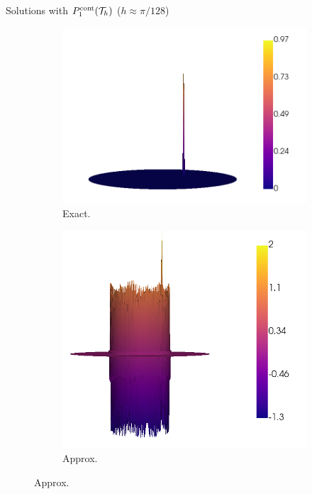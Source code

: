 	\begin{frame}{Solutions with $\relax{P}^{\text{cont}}_1(\mathcal{T}_h)$ ($h\approx \pi/128$)}
		\begin{figure}[h!]
			\begin{subfigure}{0.49\textwidth}
				\centering
				\includegraphics[scale=0.23]{img/Conveccion_Reaccion/strong/conv_react_u_ex_nx-256.png}
				\caption{Exact.}
			\end{subfigure}
			\begin{subfigure}{0.49\textwidth}
				\centering
				\includegraphics[scale=0.23]{img/Conveccion_Reaccion/strong/conv_react_u_FE_nx-256.png}
				\caption{Approx.}
			\end{subfigure}
		\end{figure}
	\end{frame}

